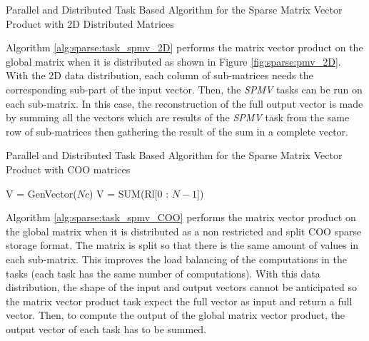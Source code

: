 \begin{algorithm}[h]
	\DontPrintSemicolon
	\caption{Parallel and Distributed Task Based Algorithm for the Sparse  Matrix Vector Product with 2D Distributed Matrices \label{alg:sparse:task_spmv_2D}}
	\;
	\;
\end{algorithm}

Algorithm \ref{alg:sparse:task_spmv_2D} performs the matrix vector product on the global matrix when it is distributed as shown in Figure \ref{fig:sparse:pmv_2D}.
With the 2D data distribution, each column of sub-matrices needs the corresponding sub-part of the input vector.
Then, the \textit{SPMV} tasks can be run on each sub-matrix.
In this case, the reconstruction of the full output vector is made by summing all the vectors which are results of the \textit{SPMV} task from the same row of sub-matrices then gathering the result of the sum in a complete vector.

\begin{algorithm}[h]
	\DontPrintSemicolon
	\caption{Parallel and Distributed Task Based Algorithm for the Sparse  Matrix Vector Product with COO matrices \label{alg:sparse:task_spmv_COO}}
	V = GenVector($Nc$)\;
	\;
	\;
	V = SUM(Rl[0 : $N - 1$])\;
\end{algorithm}

Algorithm \ref{alg:sparse:task_spmv_COO} performs the matrix vector product on the global matrix when it is distributed as a non restricted and split COO sparse storage format.
The matrix is split so that there is the same amount of values in each sub-matrix.
This improves the load balancing of the computations in the tasks (each task has the same number of computations).
With this data distribution, the shape of the input and output vectors cannot be anticipated so the matrix vector product task expect the full vector as input and return a full vector.
Then, to compute the output of the global matrix vector product, the output vector of each task has to be summed.

